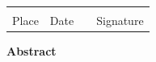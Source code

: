 \documentclass[
	pdftex,
	oneside,
	12pt,
	parskip=half,
]{scrreprt}
\begin{document}
    \begin{tabular}{ p{3cm}p{3cm}p{1cm}p{5cm} }
        \hrulefill & \hrulefill & & \hrulefill\\
        Place & Date & & Signature\\
    \end{tabular}

	\newpage
	\pagestyle{plain}

    \vspace*{5cm} 
    \begin{center}
        \textbf{Abstract}
    \end{center}

    \varabstract

    \newpage

    \tableofcontents

    \newpage

    

	\clearpage
	
\end{document}
